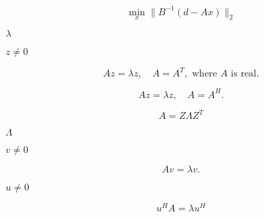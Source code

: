 {\newpage\clearpage
{}%
\begin{displaymath} \min_x \|B^{-1}(d-Ax) \|_2 \end{displaymath}%
\lthtmldisplayZ
\lthtmlcheckvsize\clearpage}

{\newpage\clearpage
{}%
$\lambda$%
\lthtmlinlinemathZ
\lthtmlcheckvsize\clearpage}

{\newpage\clearpage
{}%
$z \ne 0$%
\lthtmlinlinemathZ
\lthtmlcheckvsize\clearpage}

{\newpage\clearpage
{}%
\begin{displaymath}
Az = \lambda z, \quad A = A^T, \mbox{  where } A \mbox{ is real}.
\end{displaymath}%
\lthtmldisplayZ
\lthtmlcheckvsize\clearpage}

{\newpage\clearpage
{}%
\begin{displaymath}
Az = \lambda z, \quad A = A^H.
\end{displaymath}%
\lthtmldisplayZ
\lthtmlcheckvsize\clearpage}

{\newpage\clearpage
{}%
\begin{displaymath}
A = Z \Lambda Z^T
\end{displaymath}%
\lthtmldisplayZ
\lthtmlcheckvsize\clearpage}

{\newpage\clearpage
{}%
$\Lambda$%
\lthtmlinlinemathZ
\lthtmlcheckvsize\clearpage}

{\newpage\clearpage
{}%
$v \ne 0$%
\lthtmlinlinemathZ
\lthtmlcheckvsize\clearpage}

{\newpage\clearpage
{}%
\begin{displaymath}
Av = \lambda v.
\end{displaymath}%
\lthtmldisplayZ
\lthtmlcheckvsize\clearpage}

{\newpage\clearpage
{}%
$u\neq 0$%
\lthtmlinlinemathZ
\lthtmlcheckvsize\clearpage}

{\newpage\clearpage
{}%
\begin{displaymath}
u^HA = \lambda u^H
\end{displaymath}%
\lthtmldisplayZ
\lthtmlcheckvsize\clearpage}

